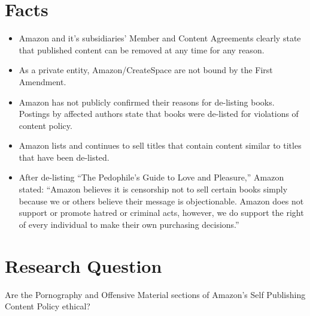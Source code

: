 \documentclass[11pt]{article}
\begin{document}
\newpage

\begin{multicols}{2}
\setcounter{page}{1}
\section{Facts}

\begin{itemize}

\item Amazon and it's subsidiaries' Member and Content Agreements clearly state that published content can be removed at any time for any reason. \cite{CreateSpaceMemberAgreement,CreateSpaceContentGuidelines,AmazonKDPContentGuidelines}

\item As a private entity, Amazon/CreateSpace are not bound by the First Amendment.

\item Amazon has not publicly confirmed their reasons for de-listing books. Postings by affected authors state that books were de-listed for violations of content policy. \cite{KittSelfPubRevolution} 

\item Amazon lists and continues to sell titles that contain content similar to titles that have been de-listed. \cite{AmazonLolitaDTPListing}

\item After de-listing ``The Pedophile's Guide to Love and Pleasure,'' Amazon stated: ``Amazon believes it is censorship not to sell certain books simply because we or others believe their message is objectionable.  Amazon does not support or promote hatred or criminal acts, however, we do support the right of every individual to make their own purchasing decisions.'' \cite{TechCrunchAmazonCensorship}

\end{itemize}

\section{Research Question}

Are the Pornography and Offensive Material sections of Amazon's Self Publishing Content Policy ethical?


\end{multicols}
\end{document}

